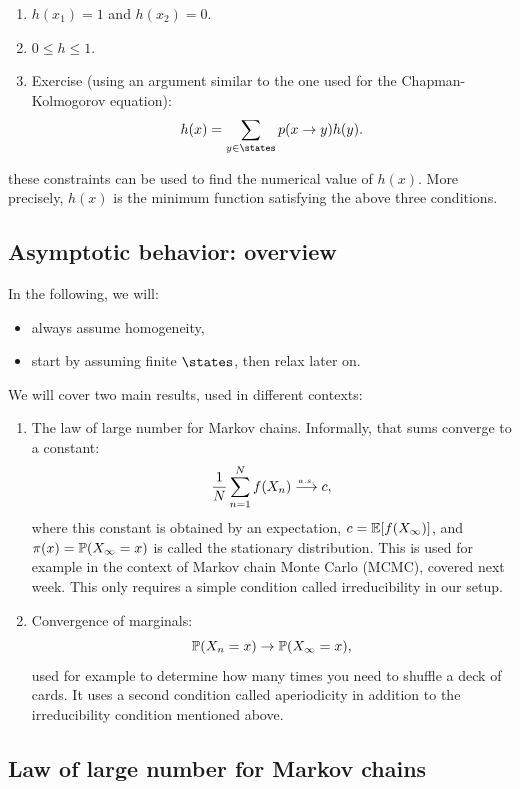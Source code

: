 \documentclass{article}
\begin{document}
\begin{enumerate}
  \item $h(x_1) = 1$ and $h(x_2) = 0$.
  \item $0 \le h \le 1$.
  \item Exercise (using an argument similar to the one used for the Chapman-Kolmogorov equation): \[ h(x) = \sum_{y\in\states} p(x\to y) h(y). \]
\end{enumerate}

 these constraints can be used to find the numerical value of $h(x)$. More precisely, $h(x)$ is the minimum function satisfying the above three conditions.


\subsection{Asymptotic behavior: overview}

 In the following, we will:
\begin{itemize}
  \item always assume homogeneity,
  \item start by assuming finite $\states$, then relax later on.
\end{itemize}

We will cover two main results, used in different contexts:
\begin{enumerate}
  \item The law of large number for Markov chains. Informally, that sums converge to a constant: \[ \frac{1}{N} \sum_{n=1}^N f(X_n) \ascv c,\]where this constant is obtained by an expectation, $c = \E[f(X_\infty)]$, and $\pi(x) = \P(X_\infty = x)$ is called the stationary distribution. This is used for example in the context of Markov chain Monte Carlo (MCMC), covered next week. This only requires a simple condition called irreducibility in our setup.
  \item Convergence of marginals: \[ \P(X_n = x) \to \P(X_\infty = x), \]used for example to determine how many times you need to shuffle a deck of cards. It uses a second condition called aperiodicity in addition to the irreducibility condition mentioned above.
\end{enumerate}


\subsection{Law of large number for Markov chains}
\end{document}
